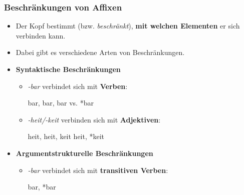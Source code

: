 \begin{frame}
\frametitle{Beschränkungen von Affixen}

\begin{itemize}
\item Der Kopf bestimmt (bzw. \emph{beschränkt}), \textbf{mit welchen Elementen} er sich verbinden kann.
\item Dabei gibt es verschiedene Arten von Beschränkungen.

\medskip 	

\item \textbf{Syntaktische Beschränkungen}

\begin{itemize}
\item \textit{-bar} verbindet sich mit \textbf{Verben}:

\ea {}bar, bar, bar vs. *bar
\z

\item \textit{-heit/-keit} verbinden sich mit \textbf{Adjektiven}:		

\ea {}heit, heit, keit \vs *heit, *keit
\z

\end{itemize}

\item \textbf{Argumentstrukturelle Beschränkungen}

\begin{itemize}
\item \textit{-bar} verbindet sich mit \textbf{transitiven Verben}:	

\ea *bar, *bar
\z

\end{itemize}

\end{itemize}

\end{frame}


